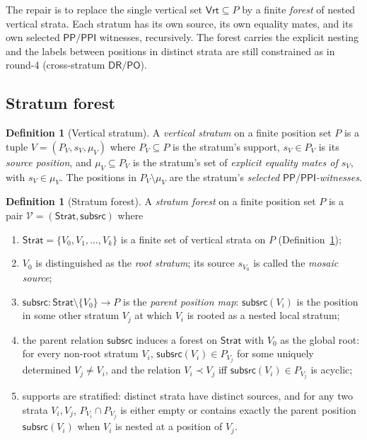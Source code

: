 \documentclass[11pt]{article}
\theoremstyle{definition}
\newtheorem{definition}[theorem]{Definition}
\theoremstyle{remark}
\newcommand{\DR}{\mathsf{DR}}
\newcommand{\PO}{\mathsf{PO}}
\newcommand{\PP}{\mathsf{PP}}
\newcommand{\PPI}{\mathsf{PPI}}
\newcommand{\Vrt}{\mathsf{Vrt}}
\newcommand{\Stratum}{\mathsf{Strat}}
\newcommand{\Subsrc}{\mathsf{subsrc}}
\begin{document}
The repair is to replace the single vertical set $\Vrt\subseteq P$ by
a finite \emph{forest} of nested vertical strata.  Each stratum has
its own source, its own equality mates, and its own selected
$\PP/\PPI$ witnesses, recursively.  The forest carries the explicit
nesting and the labels between positions in distinct strata are
still constrained as in round-4 (cross-stratum $\DR/\PO$).

\subsection{Stratum forest}

\begin{definition}[Vertical stratum]\label{def:stratum}
A \emph{vertical stratum} on a finite position set $P$ is a tuple
$V=(P_V,s_V,\mu_V)$ where $P_V\subseteq P$ is the stratum's support,
$s_V\in P_V$ is its \emph{source position}, and
$\mu_V\subseteq P_V$ is the stratum's set of \emph{explicit equality
mates of $s_V$}, with $s_V\in\mu_V$.  The positions in
$P_V\setminus\mu_V$ are the stratum's \emph{selected
$\PP/\PPI$-witnesses}.
\end{definition}

\begin{definition}[Stratum forest]\label{def:stratum-forest}
A \emph{stratum forest} on a finite position set $P$ is a pair
$\mathcal V=(\Stratum,\Subsrc)$ where
\begin{enumerate}[label=(SF\arabic*)]
\item $\Stratum=\{V_0,V_1,\dots,V_k\}$ is a finite set of vertical
  strata on $P$ (Definition~\ref{def:stratum});
\item $V_0$ is distinguished as the \emph{root stratum}; its source
  $s_{V_0}$ is called the \emph{mosaic source};
\item $\Subsrc:\Stratum\setminus\{V_0\}\to P$ is the \emph{parent
  position map}: $\Subsrc(V_i)$ is the position in some other stratum
  $V_{j}$ at which $V_i$ is rooted as a nested local stratum;
\item the parent relation $\Subsrc$ induces a forest on $\Stratum$
  with $V_0$ as the global root: for every non-root stratum $V_i$,
  $\Subsrc(V_i)\in P_{V_j}$ for some uniquely determined $V_j\neq
  V_i$, and the relation $V_i\prec V_j$ iff
  $\Subsrc(V_i)\in P_{V_j}$ is acyclic;
\item supports are stratified: distinct strata have distinct sources,
  and for any two strata $V_i,V_j$, $P_{V_i}\cap P_{V_j}$ is either
  empty or contains exactly the parent position $\Subsrc(V_i)$ when
  $V_i$ is nested at a position of $V_j$.
\end{enumerate}
\end{definition}
\end{document}
